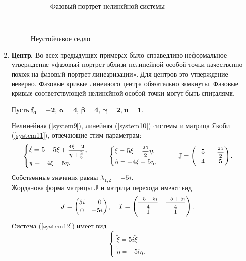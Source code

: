 \documentclass[12pt, a4paper]{article}
\begin{document}
\begin{enumerate}
\begin{figure}[H]
\begin{subfigure}[H]{0.4\textwidth}
		\caption{Фазовый портрет нелинейной системы}
	\end{subfigure}	
	\\[0.2cm]
	\caption{Неустойчивое седло}
\end{figure}	
\item \textbf{Центр.} Во всех предыдущих примерах было справедливо неформальное утверждение «фазовый портрет вблизи нелинейной особой точки качественно похож на фазовый портрет линеаризации». Для центров это утверждение неверно. Фазовые кривые линейного центра обязательно замкнуты. Фазовые кривые соответствующей нелинейной особой точки могут быть спиралями.

Пусть $\boldsymbol{f_0=-2,\,\alpha=4,\,\beta=4,\,\gamma=2,\,u=1}$.

Нелинейная (\ref{system9}), линейная (\ref{system10}) системы и матрица Якоби (\ref{system11}), отвечающие этим параметрам:
\begin{gather*}
	\begin{cases}
		\dot \xi=5-5\xi+\hbox{\footnotesize$\displaystyle\frac{4\xi-2}{\eta+\frac{2}{5}}$},\\
		\dot \eta=-4\xi-5\eta,
	\end{cases}
	\qquad
	\begin{cases}
		\dot\xi=5\xi+\hbox{\footnotesize$\displaystyle\frac{25}{2}$}\eta,\\
		\dot \eta=-4\xi-5\eta,
	\end{cases}
	\qquad
	\mathbb{J}=\begin{pmatrix}
		\phantom{-}5 & \phantom{-}\hbox{\footnotesize$\displaystyle\frac{25}{2}$} \\
		-4 & -5
	\end{pmatrix}.
\end{gather*}
Собственные значения равны $\lambda_{1,2}=\pm5i.$\\
Жорданова форма матрицы $\mathbb{J}$ и матрица перехода имеют вид
\[
J=\begin{pmatrix}
	5i & \phantom{-}0 \\
	0 & -5i
\end{pmatrix},
\quad
T=\begin{pmatrix}
	\hbox{\footnotesize$\displaystyle\frac{-5-5i}{4}$} & \hbox{\footnotesize$\displaystyle\frac{-5+5i}{4}$} \\
	1 & 1
\end{pmatrix}.
\]
Cистема (\ref{system12}) имеет вид
\[
\begin{cases}
	\dot{\tilde{\xi}}=5i\tilde{\xi},\\
	\dot{\tilde{\eta}}=-5i\tilde{\eta}.
\end{cases}
\]
\begin{figure}[H]
	\centering
	\begin{subfigure}[H]{0.4\textwidth}

\end{subfigure}
\end{figure}
\end{enumerate}
\end{document}
